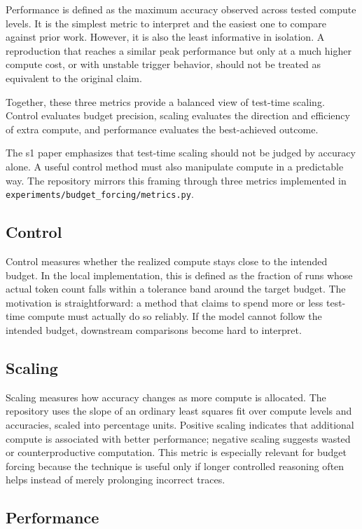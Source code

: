 Performance is defined as the maximum accuracy observed across tested compute levels. It is the simplest metric to interpret and the easiest one to compare against prior work. However, it is also the least informative in isolation. A reproduction that reaches a similar peak performance but only at a much higher compute cost, or with unstable trigger behavior, should not be treated as equivalent to the original claim.

Together, these three metrics provide a balanced view of test-time scaling. Control evaluates budget precision, scaling evaluates the direction and efficiency of extra compute, and performance evaluates the best-achieved outcome.
\label{sec:metrics}

The s1 paper emphasizes that test-time scaling should not be judged by accuracy alone. A useful control method must also manipulate compute in a predictable way. The repository mirrors this framing through three metrics implemented in \texttt{experiments/budget\_forcing/metrics.py}.

\subsection{Control}

Control measures whether the realized compute stays close to the intended budget. In the local implementation, this is defined as the fraction of runs whose actual token count falls within a tolerance band around the target budget. The motivation is straightforward: a method that claims to spend more or less test-time compute must actually do so reliably. If the model cannot follow the intended budget, downstream comparisons become hard to interpret.

\subsection{Scaling}

Scaling measures how accuracy changes as more compute is allocated. The repository uses the slope of an ordinary least squares fit over compute levels and accuracies, scaled into percentage units. Positive scaling indicates that additional compute is associated with better performance; negative scaling suggests wasted or counterproductive computation. This metric is especially relevant for budget forcing because the technique is useful only if longer controlled reasoning often helps instead of merely prolonging incorrect traces.

\subsection{Performance}

